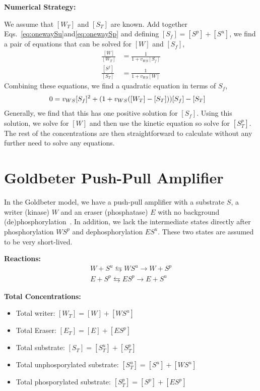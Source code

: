 \documentclass[aps,onecolumn,superscriptaddress,notitlepage]{revtex4-1}
\begin{document}
\textbf{Numerical Strategy:}

We assume that  $[W_T]$ and $[S_T]$ are known. 
Add together Eqs.~\eqref{eq:onewaySu}and\eqref{eq:onewaySp} and defining $[S_f] = [S^p]+[S^u]$, 
we find a pair of equations that can be solved for $[W]$ and $[S_f]$,
\begin{align}
\frac{[W]}{[W_T]} & = \frac{1}{1 + v_{WS}[S_f]}\\
\frac{[S^f]}{[S_T]} &= \frac{1}{1 + v_{WS}[W]}
\end{align}
Combining these equations, we find a quadratic equation in terms of $S_f$,
\begin{align}
0 &= v_{WS}[S_f]^2 +  \qty(1+v_{WS}([W_T]-[S_T]))[S_f] - [S_T]
\end{align}
Generally, we find that this has one positive solution for $[S_f]$. 
Using this solution, we solve for $[W]$ and then use the kinetic equation so solve for $[S_T^p]$. The rest of the concentrations are then straightforward to calculate without any further need to solve any equations.




\section{Goldbeter Push-Pull Amplifier}

In the Goldbeter model, we have a push-pull amplifier with a substrate $S$, a writer (kinase) $W$ and an eraser (phosphatase) $E$ with no background (de)phosphorylation~\cite{Goldbeter1981}. In addition, we lack the intermediate states directly after phosphorylation $WS^p$ and dephosphorylation $ES^u$. These two states are assumed to be very short-lived.

\textbf{Reactions:}
\begin{gather}
W + S^u \leftrightarrows WS^u  \rightarrow W + S^p\\
E + S^p \leftrightarrows ES^p  \rightarrow E + S^u
\end{gather}

\textbf{Total Concentrations:}
\begin{itemize}
\item Total writer: $[W_T] = [W] + [WS^u]$
\item Total Eraser: $[E_T] = [E] + [ES^p]$
\item Total substrate: $[S_T] = [S^u_T] + [S^p_T]$
\item Total unphosporylated substrate: $[S^u_T] = [S^u] + [WS^u]$
\item Total phosporylated substrate: $[S^p_T] = [S^p] + [ES^p]$
\end{itemize}
\end{document}
